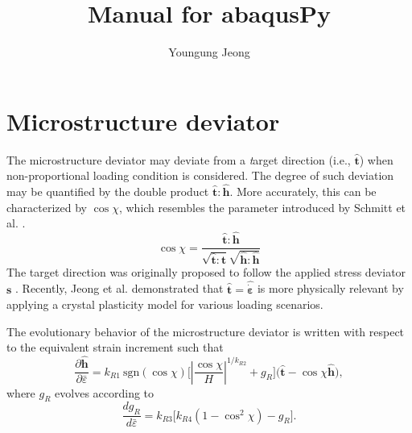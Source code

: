 \documentclass[12pt]{amsart}
\author{Youngung Jeong}
\title{Manual for abaqusPy}
\begin{document}
\pgfplotsset{compat=1.14}





\section{Microstructure deviator}
\label{sec:micd}


The microstructure deviator may deviate from a {\emph target} direction (i.e., $\hat{\mathbf{t}}$) when non-proportional loading condition is considered.
The degree of such deviation may be quantified by the double product $\hat{\mathbf{t}}:\hat{\mathbf{h}}$.
More accurately, this can be characterized by $\cos \chi$, which resembles the parameter introduced by Schmitt et al. \cite{schmitt1994parameter}.
\begin{equation}
  \label{eq:coschi}
\cos\chi = \frac{\hat{\mathbf{t}}:\hat{\mathbf{h}} }{ \sqrt{\hat{\mathbf{t}}:\hat{\mathbf{t}}}\sqrt{\hat{\mathbf{h}}:\hat{\mathbf{h}}}   }
\end{equation}
The target direction was originally proposed to follow the applied stress deviator $\mathbf{s}$ \cite{barlat2011alternative}.
Recently, Jeong et al. \cite{Jeong2016} demonstrated that $\hat{\mathbf{t}}=\hat{\dot{\mathbf{\varepsilon}}}$ is more physically relevant by applying a crystal plasticity model for various loading scenarios.

The evolutionary behavior of the microstructure deviator is written with respect to the equivalent strain increment such that
\begin{equation}
  \label{eq:dmicro1}
  \frac{\partial\hat{\mathbf{h}}}{\partial \bar{\varepsilon}} = k_{R1}\ \text{sgn}(\cos\chi)\big[|\frac{\cos\chi}{H}|^{1/k_{R2}} +g_R \big] \big(\hat{\mathbf{t}}-\cos\chi \hat{\mathbf{h}}\big),
\end{equation}
where $g_R$ evolves according to
\begin{equation}
  \label{eq:dmicro2}
\frac{dg_R}{d\bar{\varepsilon}} = k_{R3} \big[k_{R4} (1-\cos^2\chi) -g_R \big].
\end{equation}
\end{document}
